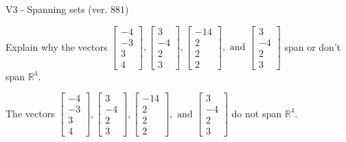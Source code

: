 \begin{exercise}
  \begin{exerciseTitle}V3 - Spanning sets (ver. 881)\end{exerciseTitle}
  \begin{exerciseStatement}
    Explain why the vectors \(\left[\begin{array}{r}
-4 \\
-3 \\
3 \\
4
\end{array}\right] , \left[\begin{array}{r}
3 \\
-4 \\
2 \\
3
\end{array}\right] , \left[\begin{array}{r}
-14 \\
2 \\
2 \\
2
\end{array}\right] , \text{ and } \left[\begin{array}{r}
3 \\
-4 \\
2 \\
3
\end{array}\right]\) span or don't span \(\mathbb{R}^4\). 
	


  \end{exerciseStatement}
  \begin{exerciseAnswer}
   The vectors \(\left[\begin{array}{r}
-4 \\
-3 \\
3 \\
4
\end{array}\right] , \left[\begin{array}{r}
3 \\
-4 \\
2 \\
3
\end{array}\right] , \left[\begin{array}{r}
-14 \\
2 \\
2 \\
2
\end{array}\right] , \text{ and } \left[\begin{array}{r}
3 \\
-4 \\
2 \\
3
\end{array}\right]\) 
  	 do not  
	span \(\mathbb{R}^4\).
  


  \end{exerciseAnswer}
\end{exercise}